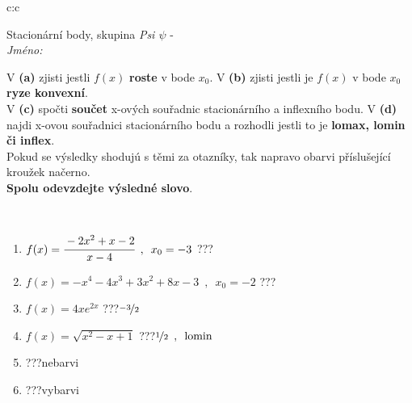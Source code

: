 \documentclass[10pt]{report}
\begin{document}
\newpage
\thispagestyle{empty}
\begin{tabular}{c:c}
\begin{minipage}[c][104.5mm][t]{0.5\linewidth}
\begin{center}
\vspace{7mm}
{\huge Stacionární body, skupina \textit{Psi $\psi$} -}\\[5mm]
\textit{Jméno:}\phantom{xxxxxxxxxxxxxxxxxxxxxxxxxxxxxxxxxxxxxxxxxxxxxxxxxxxxxxxxxxxxxxxxx}\\[5mm]
\begin{minipage}{0.95\linewidth}
\begin{center}
{\small V \textbf{(a)} zjisti jestli $f(x)$ \textbf{roste} v bode $x_0$. V \textbf{(b)} zjisti jestli je $f(x)$ v bode $x_0$ \textbf{ryze konvexní}.\\V \textbf{(c)} spočti \textbf{součet} x-ových souřadnic stacionárního a inflexního bodu. V \textbf{(d)} najdi x-ovou souřadnici stacionárního bodu a rozhodli jestli to je \textbf{lomax, lomin či inflex}.\\Pokud se výsledky shodujú s těmi za otazníky, tak napravo obarvi příslušející kroužek načerno.\\\textbf{Spolu odevzdejte výsledné slovo}}.
\end{center}
\end{minipage}
\\[1mm]
\begin{minipage}{0.79\linewidth}
\begin{center}
\begin{varwidth}{\linewidth}
\begin{enumerate}
\normalsize
\item $f(x)=\cfrac{-2x^2+x-2}{x-4}\enspace , \enspace x_0=-3$\quad \dotfill\; ???\;\dotfill \quad {}
\item $f(x)=-x^4-4x^3+3x^2+8x-3\enspace , \enspace x_0=-2$\quad \dotfill\; ???\;\dotfill \quad {}
\item $f(x)=4xe^{2x}$\quad \dotfill\; ???\;\dotfill \quad $\nicefrac{-3}{2}$
\item $f(x)=\sqrt{x^2-x+1}$\quad \dotfill\; ???\;\dotfill \quad $\nicefrac{1}{2}\enspace , \enspace \mathrm{lomin}$
\item \quad \dotfill\; ???\;\dotfill \quad nebarvi
\item \quad \dotfill\; ???\;\dotfill \quad vybarvi
\end{enumerate}
\end{varwidth}
\end{center}

\end{minipage}
\end{center}
\end{minipage}
\end{tabular}
\end{document}
